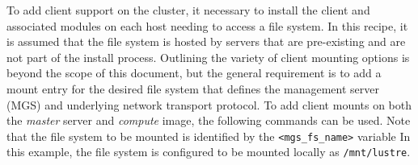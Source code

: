 To add \Lustre{} client support on the cluster, it necessary to install the client
and associated modules on each host needing to access a \Lustre{} file system.  In
this recipe, it is assumed that the \Lustre{} file system is hosted by servers
that are pre-existing and are not part of the install process. Outlining the
variety of \Lustre{} client mounting options is beyond the scope of this document,
but the general requirement is to add a mount entry for the desired file system
that defines the management server (MGS) and underlying network transport
protocol.  To add client mounts on both the {\em master} server and {\em
compute} image, the following commands can be used. Note that the \Lustre{} file
system to be mounted is identified by the \texttt{<mgs\_fs\_name>} variable 
In this example, the file system is configured to be mounted locally
as \texttt{/mnt/lustre}.
